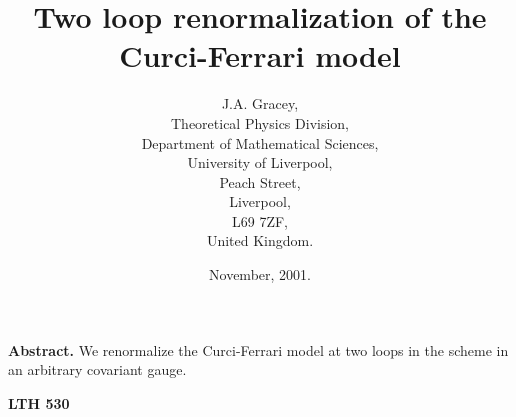 \documentclass[a4paper,11pt]{article}
\providecommand{\MSbar}{\overline{\mbox{MS}}}
\begin{document}
\title{Two loop \myHighlight{$\MSbar$}\coordHE{} renormalization of the Curci-Ferrari model} 
\author{J.A. Gracey, \\ Theoretical Physics Division, \\ Department 
of Mathematical Sciences, \\ University of Liverpool, \\ Peach Street, \\ 
Liverpool, \\ L69 7ZF, \\ United Kingdom.} 
\date{November, 2001.} 
\maketitle 
\vspace{5cm} 
\noindent 
{\bf Abstract.} We renormalize the Curci-Ferrari model at two loops in the 
\myHighlight{$\MSbar$}\coordHE{} scheme in an arbitrary covariant gauge. 

\vspace{-16cm} 
\hspace{13.5cm} 
{\bf LTH 530} 
\end{document}
